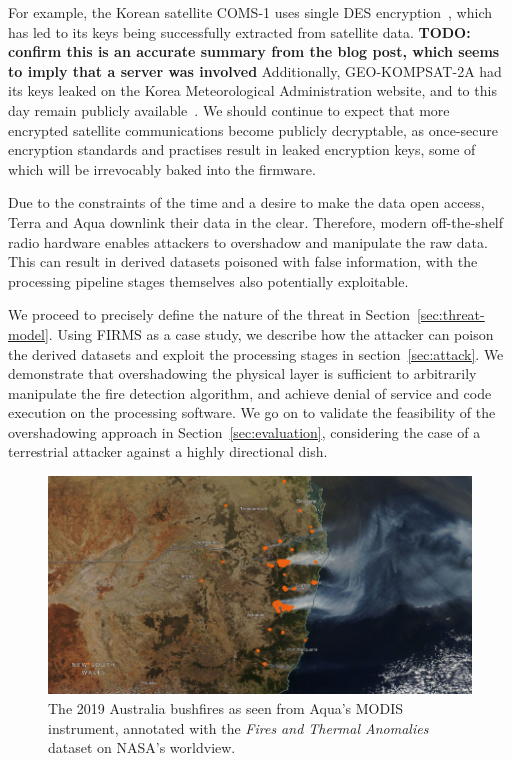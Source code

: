 For example, the Korean satellite COMS-1 uses single DES encryption~\cite{lrit-key-dec}, which has led to its keys being successfully extracted from satellite data. \textbf{TODO: confirm this is an accurate summary from the blog post, which seems to imply that a server was involved}
Additionally, GEO-KOMPSAT-2A had its keys leaked on the Korea Meteorological Administration website, and to this day remain publicly available~\cite{xrit-rx}.
We should continue to expect that more encrypted satellite communications become publicly decryptable, as once-secure encryption standards and practises result in leaked encryption keys, some of which will be irrevocably baked into the firmware.

Due to the constraints of the time and a desire to make the data open access, Terra and Aqua downlink their data in the clear.
Therefore, modern off-the-shelf radio hardware enables attackers to overshadow and manipulate the raw data.
This can result in derived datasets poisoned with false information, with the processing pipeline stages themselves also potentially exploitable.

We proceed to precisely define the nature of the threat in Section~\ref{sec:threat-model}.
Using FIRMS as a case study, we describe how the attacker can poison the derived datasets and exploit the processing stages in section~\ref{sec:attack}.
We demonstrate that overshadowing the physical layer is sufficient to arbitrarily manipulate the fire detection algorithm, and achieve denial of service and code execution on the processing software.
We go on to validate the feasibility of the overshadowing approach in Section~\ref{sec:evaluation}, considering the case of a terrestrial attacker against a highly directional dish.

\begin{figure}
    \centering
    \includegraphics[width=\columnwidth]{diagrams/bushfire.png}
    \caption{The 2019 Australia bushfires as seen from Aqua's MODIS instrument, annotated with the \textit{Fires and Thermal Anomalies} dataset on NASA's worldview.\protect\footnotemark}
    \label{fig:bushfire}
\end{figure}


